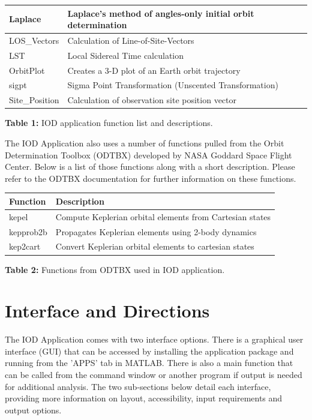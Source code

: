 \documentclass{article}
\begin{document}
\begin{center}
\begin{tabular}{|p{4cm}| p{9.4cm}|}
			Laplace & Laplace's method of angles-only initial orbit determination\\ \hline
			LOS\_Vectors & Calculation of Line-of-Site-Vectors\\ \hline
			LST & Local Sidereal Time calculation\\ \hline
			OrbitPlot & Creates a 3-D plot of an Earth orbit trajectory\\ \hline
			sigpt & Sigma Point Transformation (Unscented Transformation)\\ \hline
			Site\_Position & Calculation of observation site position vector\\ \hline
		\end{tabular}
		\newline\newline
		\textbf{Table 1:} IOD application function list and descriptions.
		\end{center}

		 The IOD Application also uses a number of functions pulled from the Orbit Determination Toolbox (ODTBX) developed by NASA Goddard Space Flight Center. Below is a list of those functions along with a 
		short description. Please refer to the ODTBX documentation for further information on these functions.

		\begin{center}
		\begin{tabular}{|p{4cm}|p{9.4cm}|}
			\hline
			\sc \textbf{Function} & \sc \textbf{Description} \\ \hline
			kepel & Compute Keplerian orbital elements from Cartesian states\\ \hline
			kepprob2b & Propagates Keplerian elements using 2-body dynamics\\ \hline
			kep2cart & Convert Keplerian orbital elements to cartesian states\\ \hline
		\end{tabular}
		\newline\newline
		\textbf{Table 2:} Functions from ODTBX used in IOD application.
		\end{center}
	\newpage
	\section{Interface and Directions}
	\hspace{0.45 cm}The IOD Application comes with two interface options. There is a graphical user interface (GUI) that can be accessed by installing the application package and running from the 'APPS' tab in 
        MATLAB. There is also a main function that can be called from the command window or another program if output is needed for additional analysis. The two sub-sections below detail each interface,       
        providing more information on layout, accessibility, input requirements and output options.
\end{document}
